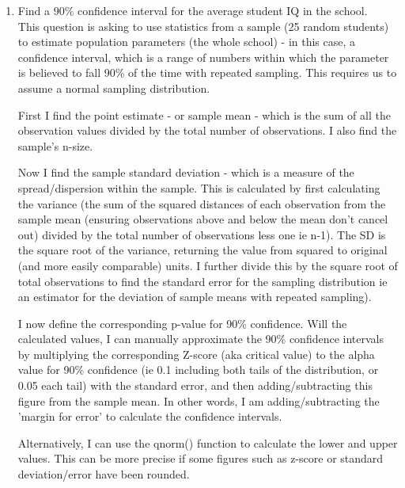 \documentclass[12pt,letterpaper]{article}
\begin{document}
\begin{enumerate}
	\item Find a 90\% confidence interval for the average student IQ in the school.\\
	
	\noindent This question is asking to use statistics from a sample (25 random students) to estimate population parameters (the whole school) - in this case, a confidence interval, which is a range of numbers within which the parameter is believed to fall 90\% of the time with repeated sampling. This requires us to assume a normal sampling distribution.
	
	\noindent First I find the point estimate - or sample mean - which is the sum of all the observation values divided by the total number of observations. I also find the sample's n-size.  
	
	
	
	\noindent Now I find the sample standard deviation - which is a measure of the spread/dispersion within the sample. This is calculated by first calculating the variance (the sum of the squared distances of each observation from the sample mean (ensuring observations above and below the mean don't cancel out) divided by the total number of observations less one ie n-1). The SD is the square root of the variance, returning the value from squared to original (and more easily comparable) units. I further divide this by the square root of total observations to find the standard error for the sampling distribution ie an estimator for the deviation of sample means with repeated sampling).
	
	
	
	\noindent I now define the corresponding p-value for 90\% confidence. Will the calculated values, I can manually approximate the 90\% confidence intervals by multiplying the corresponding Z-score (aka critical value) to the alpha value for 90\% confidence (ie 0.1 including both tails of the distribution, or 0.05 each tail) with the standard error, and then adding/subtracting this figure from the sample mean. In other words, I am adding/subtracting the 'margin for error' to calculate the confidence intervals.
	
	
	
	\noindent Alternatively, I can use the qnorm() function to calculate the lower and upper values. This can be more precise if some figures such as z-score or standard deviation/error have been rounded.
	

\end{enumerate}
\end{document}
